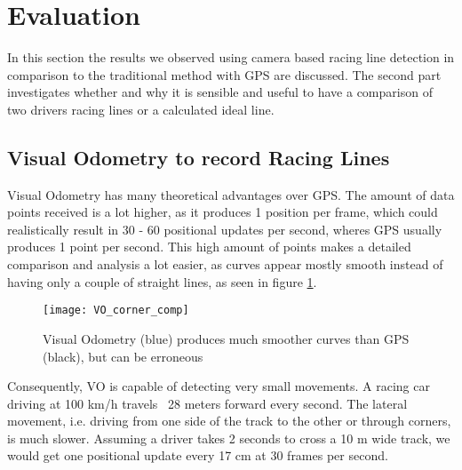 \section{Evaluation}
\label{sec:evaluation}
In this section the results we observed using camera based racing line detection in comparison to the traditional method with GPS are discussed. The second part investigates whether and why it is sensible and useful to have a comparison of two drivers racing lines or a calculated ideal line.

\subsection{Visual Odometry to record Racing Lines}
Visual Odometry has many theoretical advantages over GPS. The amount of data points received is a lot higher, as it produces 1 position per frame, which could realistically result in 30 - 60 positional updates per second, wheres GPS usually produces 1 point per second. This high amount of points makes a detailed comparison and analysis a lot easier, as curves appear mostly smooth instead of having only a couple of straight lines, as seen in figure \ref{fig:vo_gps_comp}.

\begin{figure}[!ht]
	\centering
	\texttt{[image: VO\_corner\_comp]}
	\caption{Visual Odometry (blue) produces much smoother curves than GPS (black), but can be erroneous}
	\label{fig:vo_gps_comp}
\end{figure}

Consequently, VO is capable of detecting very small movements. A racing car driving at 100 km/h travels ~28 meters forward every second. The lateral movement, i.e. driving from one side of the track to the other or through corners, is much slower. Assuming a driver takes 2 seconds to cross a 10 m wide track, we would get one positional update every 17 cm at 30 frames per second. 

